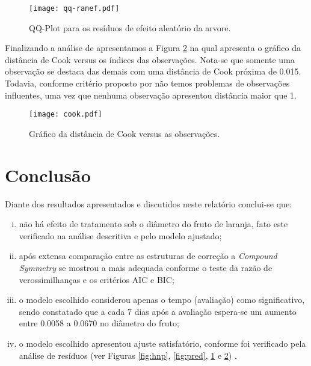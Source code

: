 \documentclass[12pt,a4paper,final]{article}
\begin{document}
\begin{figure}[H]
	\centering
	\texttt{[image: qq-ranef.pdf]}
	\caption{QQ-Plot para os resíduos de efeito aleatório da arvore.}
	\label{fig:qq-ranef}
\end{figure}

Finalizando a análise de apresentamos a Figura \ref{fig:cook} na qual apresenta o gráfico da distância de Cook
versus os índices das observações. Nota-se que somente uma observação se destaca das demais com uma distância de
Cook próxima de 0.015. Todavia, conforme critério proposto por  não temos problemas de observações
influentes, uma vez que nenhuma observação apresentou distância maior que 1.
 
\begin{figure}[H]
	\centering
	\texttt{[image: cook.pdf]}
	\caption{Gráfico da distância de Cook versus as observações.}
	\label{fig:cook}
\end{figure}

\newpage
\section{Conclusão}
Diante dos resultados apresentados e discutidos neste relatório conclui-se que: 
\begin{enumerate}[(i)]
	\item não há efeito de tratamento sob o diâmetro do fruto de laranja, fato este verificado na análise descritiva e pelo modelo ajustado; 
	\item após extensa comparação entre as estruturas de correção a \emph{Compound Symmetry} se mostrou a mais adequada
	conforme o teste da razão de verossimilhanças e os critérios AIC e BIC;
	\item o modelo escolhido considerou apenas o tempo (avaliação) como significativo, sendo constatado que a cada 7 dias após a avaliação espera-se um aumento entre 0.0058 a 0.0670 no diâmetro do fruto;
	\item o modelo escolhido apresentou ajuste satisfatório, conforme foi verificado pela análise de resíduos (ver Figuras \ref{fig:hnp}, \ref{fig:pred}, \ref{fig:qq-ranef} e \ref{fig:cook}) . 
\end{enumerate}

\end{document}
